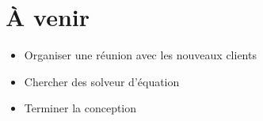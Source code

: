 \documentclass{beamer}
\begin{document}

\section{À venir}

\begin{frame}{\secname}
	\begin{itemize}
		\item Organiser une réunion avec les nouveaux clients
	\end{itemize}
	\begin{itemize}
		\item Chercher des solveur d'équation
	\end{itemize}
	\begin{itemize}
		\item Terminer la conception 
	\end{itemize}
\end{frame}
\end{document}

